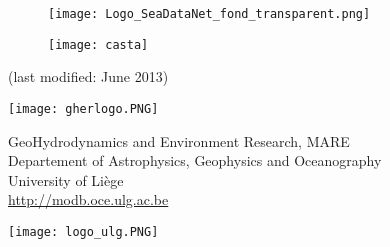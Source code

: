 \begin{titlepage}


\begin{figure}[H]
\centering
\texttt{[image: Logo\_SeaDataNet\_fond\_transparent.png]}
\end{figure}

\begin{center}
\vspace*{1cm}

\colorbox{grey}{
	\parbox[t]{1.0\linewidth}{
	\huge
		\printtitle 
		\vspace*{0.7cm}
	}
}

  	\vspace*{1cm}
  	
\printauthor								%

\vspace*{1cm}


\begin{figure}[H]
\centering
\texttt{[image: casta]}
\end{figure}

\normalsize{(last modified: June 2013)}

\vfill

\parbox{.20\textwidth}{
\flushleft
\texttt{[image: gherlogo.PNG]}
}\parbox{.60\textwidth}{
\centering
\vspace{.4cm}


\footnotesize{GeoHydrodynamics and Environment Research, MARE\\ 
Departement of Astrophysics, Geophysics and Oceanography\\
University of Li\`{e}ge\\ 
\url{http://modb.oce.ulg.ac.be}
}
\vspace{.15cm}
}\parbox{.20\textwidth}{
\flushright
\texttt{[image: logo\_ulg.PNG]}
}

\end{center}

\end{titlepage}

%
%

